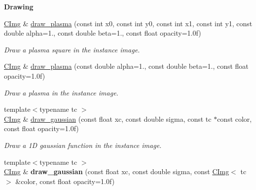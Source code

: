 \begin{Indent}{\bf Drawing}
\begin{DoxyCompactItemize}
\item 
\hyperlink{structcimg__library_1_1_c_img}{C\-Img} \& \hyperlink{structcimg__library_1_1_c_img_a557968ccbb6167c0c749f9ae6a02d907}{draw\-\_\-plasma} (const int x0, const int y0, const int x1, const int y1, const double alpha=1., const double beta=1., const float opacity=1.\-0f)
\begin{DoxyCompactList}\small\item\em Draw a plasma square in the instance image. \end{DoxyCompactList}\item 
\hyperlink{structcimg__library_1_1_c_img}{C\-Img} \& \hyperlink{structcimg__library_1_1_c_img_a8f10d627846ff97696f0304ec2f83c4b}{draw\-\_\-plasma} (const double alpha=1., const double beta=1., const float opacity=1.\-0f)
\begin{DoxyCompactList}\small\item\em Draw a plasma in the instance image. \end{DoxyCompactList}\item 
{\footnotesize template$<$typename tc $>$ }\\\hyperlink{structcimg__library_1_1_c_img}{C\-Img} \& \hyperlink{structcimg__library_1_1_c_img_ab5ef73b2bf38b55dbd20e1fa5e180391}{draw\-\_\-gaussian} (const float xc, const double sigma, const tc $\ast$const color, const float opacity=1.\-0f)
\begin{DoxyCompactList}\small\item\em Draw a 1\-D gaussian function in the instance image. \end{DoxyCompactList}\item 
\hypertarget{structcimg__library_1_1_c_img_a85f41116c33982a85ba4c3ead44c8bdc}{{\footnotesize template$<$typename tc $>$ }\\\hyperlink{structcimg__library_1_1_c_img}{C\-Img} \& {\bfseries draw\-\_\-gaussian} (const float xc, const double sigma, const \hyperlink{structcimg__library_1_1_c_img}{C\-Img}$<$ tc $>$ \&color, const float opacity=1.\-0f)}\label{structcimg__library_1_1_c_img_a85f41116c33982a85ba4c3ead44c8bdc}


\end{DoxyCompactItemize}
\end{Indent}
